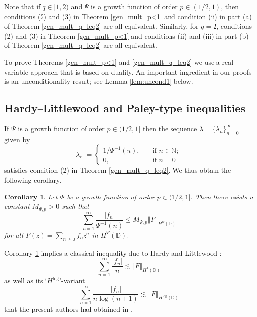 \documentclass[a4paper, leqno, 10pt]{amsart}
\numberwithin{equation}{section}
\newtheorem{corollary}[thm]{Corollary}
\newcommand{\norm}[1]{\left\Vert#1\right\Vert}
\newcommand{\abs}[1]{\left|#1\right|}
\newcommand{\D}{\mathbb{D}}
\newcommand{\N}{\mathbb{N}}
\begin{document}
Note that if $q \in [1,2)$ and $\Psi$ is a growth function of order $p \in (1/2,1)$, then conditions (2) and (3) in Theorem \ref{gen_mult_p<1} and condition (ii) in part (a) of Theorem \ref{gen_mult_q_leq2} are all equivalent. Similarly, for $q=2$, conditions (2) and (3) in Theorem \ref{gen_mult_p<1} and conditions (ii) and (iii) in part (b) of Theorem \ref{gen_mult_q_leq2} are all equivalent.

To prove Theorems \ref{gen_mult_p<1} and \ref{gen_mult_q_leq2} we use a real-variable approach that is based on duality. An important ingredient in our proofs is an unconditionality result; see Lemma \ref{lem:uncond1} below. 

\subsection*{Hardy--Littlewood and Paley-type inequalities}


If $\Psi$ is a growth function of order $p \in (1/2,1]$ then the sequence $\lambda= \{ \lambda_n \}_{n=0}^{\infty} $ given by
\[
\lambda_n := 
\begin{cases}
1/\Psi^{-1} (n), \quad & \text{if } n \in \N; \\
0, \quad & \text{if } n = 0
\end{cases}
\]
satisfies condition (2) in Theorem \ref{gen_mult_q_leq2}. We thus obtain the following corollary.

\begin{corollary}\label{HL_complex}
Let $\Psi$ be a growth function of order $p \in (1/2,1]$. 
Then there exists a  constant $M_{\Psi, p} >0 $ such that
\[
\sum_{n=1}^{\infty} \frac{ \abs{f_n}}{ \Psi^{-1} (n) } \leq M_{\Psi, p} \norm{ F }_{H^{\Psi} (\D)} 
\]
for all $F(z) = \sum_{n \geq 0} f_n z^n$ in $H^{\Psi} (\D)$. 
\end{corollary}

Corollary \ref{HL_complex} implies a classical inequality due to Hardy and Littlewood \cite{H-L}:
\begin{equation}\label{H-L_p=1}
\sum_{n=1}^{\infty} \frac{ \abs{f_n}}{ n} \lesssim \norm{ F }_{H^1 (\D)} 
\end{equation}
as well as its `$H^{\log}$'-variant
\begin{equation}\label{H-L_Hlog}
\sum_{n=1}^{\infty} \frac{ \abs{f_n}}{ n \log (n+1)} \lesssim \norm{ F }_{H^{\log} (\D)} 
\end{equation}
that the present authors had obtained in \cite{BPRS}.
\end{document}
